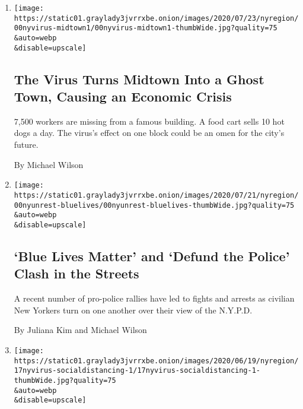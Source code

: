 \begin{enumerate}
\def\labelenumi{\arabic{enumi}.}
\item
  \href{/2020/07/26/nyregion/nyc-coronavirus-time-life-building.html}{}

  \texttt{[image: https://static01.graylady3jvrrxbe.onion/images/2020/07/23/nyregion/00nyvirus-midtown1/00nyvirus-midtown1-thumbWide.jpg?quality=75\\\&auto=webp\\\&disable=upscale]}

  \hypertarget{the-virus-turns-midtown-into-a-ghost-town-causing-an-economic-crisis}{%
  \subsection{The Virus Turns Midtown Into a Ghost Town, Causing an
  Economic
  Crisis}\label{the-virus-turns-midtown-into-a-ghost-town-causing-an-economic-crisis}}

  7,500 workers are missing from a famous building. A food cart sells 10
  hot dogs a day. The virus's effect on one block could be an omen for
  the city's future.

  By Michael Wilson
\item
  \href{/2020/07/22/nyregion/ny-back-the-blue-lives-matter-rallies.html}{}

  \texttt{[image: https://static01.graylady3jvrrxbe.onion/images/2020/07/21/nyregion/00nyunrest-bluelives/00nyunrest-bluelives-thumbWide.jpg?quality=75\\\&auto=webp\\\&disable=upscale]}

  \hypertarget{blue-lives-matter-and-defund-the-police-clash-in-the-streets}{%
  \subsection{`Blue Lives Matter' and `Defund the Police' Clash in the
  Streets}\label{blue-lives-matter-and-defund-the-police-clash-in-the-streets}}

  A recent number of pro-police rallies have led to fights and arrests
  as civilian New Yorkers turn on one another over their view of the
  N.Y.P.D.

  By Juliana Kim and Michael Wilson
\item
  \href{/2020/06/18/nyregion/coronavirus-ny-social-distancing.html}{}

  \texttt{[image: https://static01.graylady3jvrrxbe.onion/images/2020/06/19/nyregion/17nyvirus-socialdistancing-1/17nyvirus-socialdistancing-1-thumbWide.jpg?quality=75\\\&auto=webp\\\&disable=upscale]}

  \hypertarget{the-pandemic-isnt-over-new-yorkers-are-acting-as-if-it-were}{%
}
\end{enumerate}
